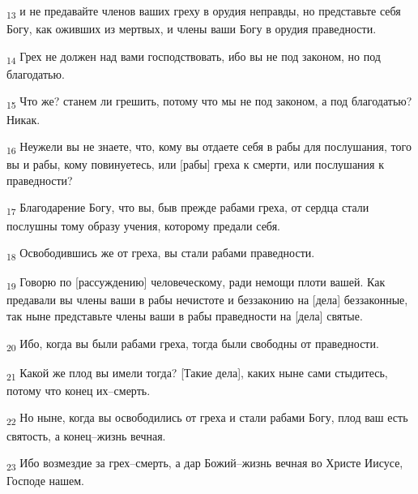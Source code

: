 \begin{tcolorbox}
\textsubscript{13} и не предавайте членов ваших греху в орудия неправды, но представьте себя Богу, как оживших из мертвых, и члены ваши Богу в орудия праведности.
\end{tcolorbox}
\begin{tcolorbox}
\textsubscript{14} Грех не должен над вами господствовать, ибо вы не под законом, но под благодатью.
\end{tcolorbox}
\begin{tcolorbox}
\textsubscript{15} Что же? станем ли грешить, потому что мы не под законом, а под благодатью? Никак.
\end{tcolorbox}
\begin{tcolorbox}
\textsubscript{16} Неужели вы не знаете, что, кому вы отдаете себя в рабы для послушания, того вы и рабы, кому повинуетесь, или [рабы] греха к смерти, или послушания к праведности?
\end{tcolorbox}
\begin{tcolorbox}
\textsubscript{17} Благодарение Богу, что вы, быв прежде рабами греха, от сердца стали послушны тому образу учения, которому предали себя.
\end{tcolorbox}
\begin{tcolorbox}
\textsubscript{18} Освободившись же от греха, вы стали рабами праведности.
\end{tcolorbox}
\begin{tcolorbox}
\textsubscript{19} Говорю по [рассуждению] человеческому, ради немощи плоти вашей. Как предавали вы члены ваши в рабы нечистоте и беззаконию на [дела] беззаконные, так ныне представьте члены ваши в рабы праведности на [дела] святые.
\end{tcolorbox}
\begin{tcolorbox}
\textsubscript{20} Ибо, когда вы были рабами греха, тогда были свободны от праведности.
\end{tcolorbox}
\begin{tcolorbox}
\textsubscript{21} Какой же плод вы имели тогда? [Такие дела], каких ныне сами стыдитесь, потому что конец их--смерть.
\end{tcolorbox}
\begin{tcolorbox}
\textsubscript{22} Но ныне, когда вы освободились от греха и стали рабами Богу, плод ваш есть святость, а конец--жизнь вечная.
\end{tcolorbox}
\begin{tcolorbox}
\textsubscript{23} Ибо возмездие за грех--смерть, а дар Божий--жизнь вечная во Христе Иисусе, Господе нашем.
\end{tcolorbox}
